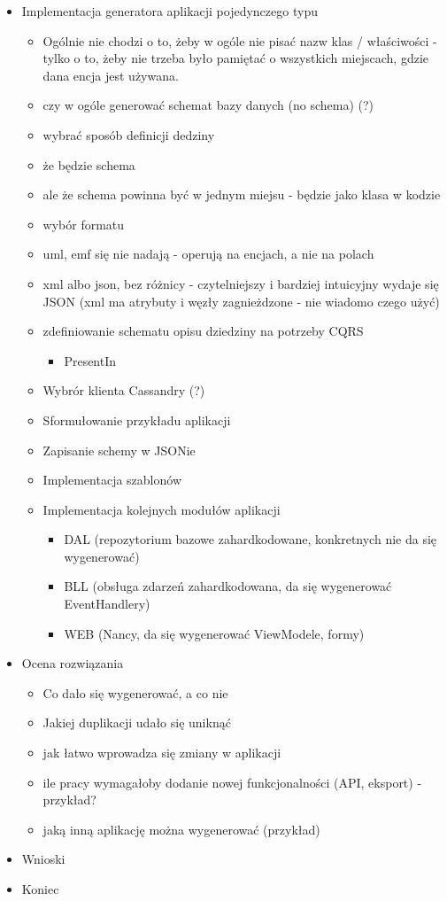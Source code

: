 \begin{itemize}
  \item Implementacja generatora aplikacji pojedynczego typu
   \begin{itemize}
    \item Ogólnie nie chodzi o to, żeby w ogóle nie pisać nazw klas / właściwości - tylko o to, żeby nie trzeba było pamiętać o wszystkich miejscach, gdzie dana encja jest używana.
    \item czy w ogóle generować schemat bazy danych (no schema) (?)
    \item wybrać sposób definicji dedziny
     \item że będzie schema
     \item ale że schema powinna być w jednym miejsu - będzie jako klasa w kodzie
     \item wybór formatu
      \item uml, emf się nie nadają - operują na encjach, a nie na polach
      \item xml albo json, bez różnicy - czytelniejszy i bardziej intuicyjny wydaje się JSON (xml ma atrybuty i węzły zagnieżdzone - nie wiadomo czego użyć)
     \item zdefiniowanie schematu opisu dziedziny na potrzeby CQRS
      \begin{itemize}
       \item PresentIn
      \end{itemize}
    \item Wybrór klienta Cassandry (?)
    \item Sformułowanie przykładu aplikacji
    \item Zapisanie schemy w JSONie
    \item Implementacja szablonów
    \item Implementacja kolejnych modułów aplikacji
     \begin{itemize}
      \item DAL (repozytorium bazowe zahardkodowane, konkretnych nie da się wygenerować)
      \item BLL (obsługa zdarzeń zahardkodowana, da się wygenerować EventHandlery)
      \item WEB (Nancy, da się wygenerować ViewModele, formy)
     \end{itemize}
   \end{itemize}
  
  \item Ocena rozwiązania
   \begin{itemize}
    \item Co dało się wygenerować, a co nie
    \item Jakiej duplikacji udało się uniknąć
    \item jak łatwo wprowadza się zmiany w aplikacji
    \item ile pracy wymagałoby dodanie nowej funkcjonalności (API, eksport) - przykład?
    \item jaką inną aplikację można wygenerować (przykład)
   \end{itemize}
  
  \item Wnioski
  
  \item Koniec

\end{itemize}

